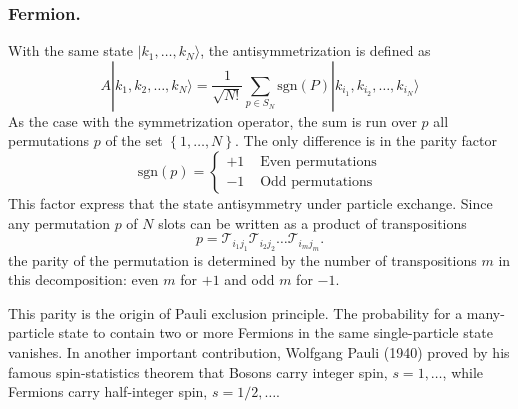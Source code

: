 \documentclass[../../../main.tex]{subfiles}
\begin{document}
\subsubsection{Fermion.}
With the same state $|k_1, \ldots, k_N\rangle $, the antisymmetrization is defined as
\begin{equation*}
  A|k_1,k_2,\ldots,k_N\rangle = \frac{1}{\sqrt{N!}} \sum_{p \in S_N} \mathrm{sgn}(P) |k_{i_1},k_{i_2},\ldots,k_{i_N}\rangle
\end{equation*}
As the case with the symmetrization operator, the sum is run over $p$ all permutations $p$ of the set $\left\{ 1,\dots,N \right\} $.
The only difference is in the parity factor
\begin{equation*}
  \mathrm{sgn}(p) =
  \begin{cases}
    +1 & \text{ Even permutations} \\
    -1 & \text{ Odd permutations}
  \end{cases}
\end{equation*}
This factor express that the state antisymmetry under particle exchange.
Since any permutation $p$ of $N$ slots can be written as a product of transpositions
\begin{equation*}
  p = \mathcal{T}_{i_1j_1} \mathcal{T}_{i_2j_2} \ldots\mathcal{T}_{i_mj_m}.
\end{equation*}
the parity of the permutation is determined by the number of transpositions $m$ in this decomposition: even $m$ for $+1$ and odd $m$ for $-1$.

This parity is the origin of Pauli exclusion principle.
The probability for a many-particle state to contain two or more Fermions in the same single-particle state vanishes.
In another important contribution, Wolfgang Pauli (1940) proved by his famous spin-statistics theorem that Bosons carry integer spin, $s=1,\dots$, while Fermions carry half-integer spin, $s = 1/2, \dots$.
\end{document}
